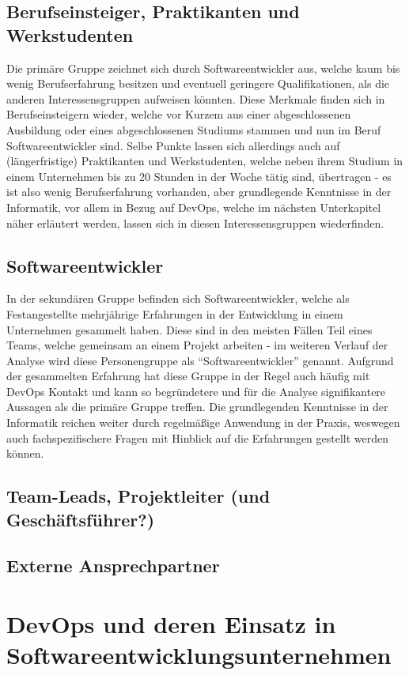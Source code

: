 \subsection{Berufseinsteiger, Praktikanten und Werkstudenten}
Die primäre Gruppe zeichnet sich durch Softwareentwickler aus, welche kaum bis wenig Berufserfahrung besitzen und eventuell geringere Qualifikationen, als die anderen Interessensgruppen aufweisen könnten.
Diese Merkmale finden sich in Berufseinsteigern wieder, welche vor Kurzem aus einer abgeschlossenen Ausbildung oder eines abgeschlossenen Studiums stammen und nun im Beruf Softwareentwickler sind. Selbe Punkte
lassen sich allerdings auch auf (längerfristige) Praktikanten und Werkstudenten, welche neben ihrem Studium in einem Unternehmen bis zu 20 Stunden in der Woche tätig sind, übertragen - es ist also wenig Berufserfahrung
vorhanden, aber grundlegende Kenntnisse in der Informatik, vor allem in Bezug auf DevOps, welche im nächsten Unterkapitel näher erläutert werden, lassen sich in diesen Interessensgruppen wiederfinden.

\subsection{Softwareentwickler}
In der sekundären Gruppe befinden sich Softwareentwickler, welche als Festangestellte mehrjährige Erfahrungen in der Entwicklung in einem Unternehmen gesammelt haben. Diese sind in den meisten Fällen Teil eines Teams, welche gemeinsam an einem Projekt arbeiten
- im weiteren Verlauf der Analyse wird diese Personengruppe als \enquote{Softwareentwickler} genannt. Aufgrund der gesammelten Erfahrung hat diese Gruppe in der Regel auch häufig mit DevOps Kontakt und kann so begründetere und für die Analyse signifikantere
Aussagen als die primäre Gruppe treffen. Die grundlegenden Kenntnisse in der Informatik reichen weiter durch regelmäßige Anwendung in der Praxis, weswegen auch fachspezifischere Fragen mit Hinblick auf die Erfahrungen gestellt werden können.

\subsection{Team-Leads, Projektleiter (und Geschäftsführer?)}

\subsection{Externe Ansprechpartner}

\section{DevOps und deren Einsatz in Softwareentwicklungsunternehmen}

